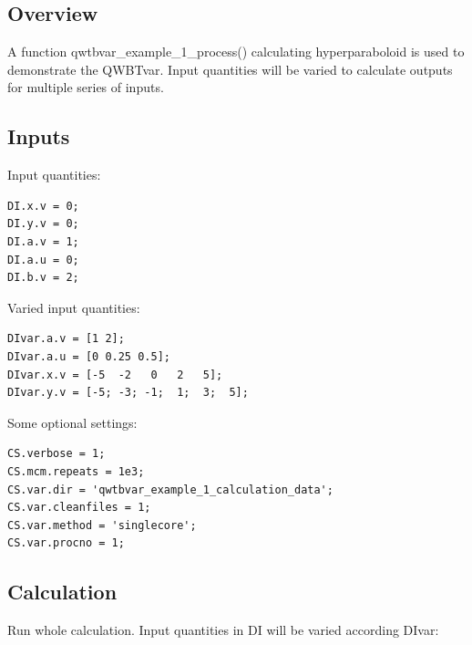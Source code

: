 \startcontents[localtoc]



{}
\subsection*{Overview}



A function qwtbvar\_example\_1\_process() calculating hyperparaboloid is used to
demonstrate the QWBTvar. Input quantities will be varied to calculate outputs
for multiple series of inputs.



{}
\subsection*{Inputs}



Input quantities:

\begin{lstlisting}
DI.x.v = 0;
DI.y.v = 0;
DI.a.v = 1;
DI.a.u = 0;
DI.b.v = 2;
\end{lstlisting}


Varied input quantities:

\begin{lstlisting}
DIvar.a.v = [1 2];
DIvar.a.u = [0 0.25 0.5];
DIvar.x.v = [-5  -2   0   2   5];
DIvar.y.v = [-5; -3; -1;  1;  3;  5];
\end{lstlisting}


Some optional settings:

\begin{lstlisting}
CS.verbose = 1;
CS.mcm.repeats = 1e3;
CS.var.dir = 'qwtbvar_example_1_calculation_data';
CS.var.cleanfiles = 1;
CS.var.method = 'singlecore';
CS.var.procno = 1;
\end{lstlisting}


{}
\subsection*{Calculation}



Run whole calculation. Input quantities in DI will be varied according DIvar:

